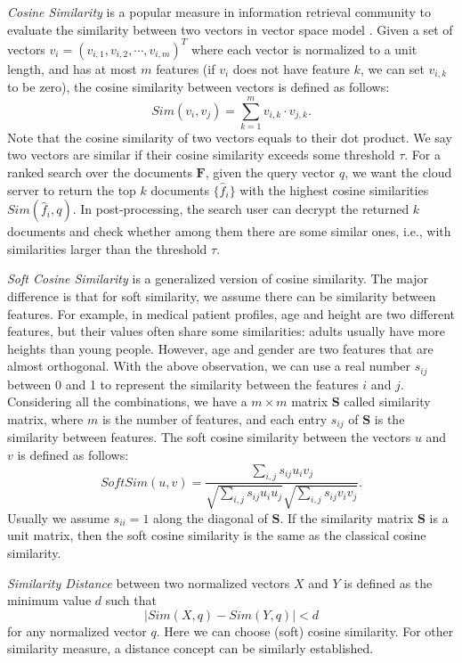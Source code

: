 \documentclass{IEEEtran}
\begin{document}
\emph{Cosine Similarity} \cite{Sun13, ATY13, TAJY14, Xia16} is a popular measure in information retrieval community to evaluate the similarity between two vectors in vector space model \cite{Sun13,ATY13,TAJY14}. Given a set of vectors $v_i = (v_{i,1}, v_{i,2}, \cdots, v_{i,m})^T$ where each vector is normalized to a unit length, and has at most $m$ features (if $v_i$ does not have feature $k$, we can set $v_{i,k}$ to be zero), the cosine similarity between vectors is defined as follows:
$$Sim(v_i,v_j) = \sum_{k=1}^m v_{i,k}\cdot v_{j,k}.$$
Note that the cosine similarity of two vectors equals to their dot product. We say two vectors are similar if their cosine similarity exceeds some threshold $\tau$. For a ranked search over the documents $\mathbf{F}$, given the query vector $q$, we want the cloud server to return the top $k$ documents $\{\hat{f}_i\}$ with the highest cosine similarities $Sim(\hat{f}_i, q)$. In post-processing, the search user can decrypt the returned $k$ documents and check whether among them there are some similar ones, i.e., with similarities larger than the threshold $\tau$.

\emph{Soft Cosine Similarity} \cite{Soft14} is a generalized version of cosine similarity. The major difference is that for soft similarity, we assume there can be similarity between features. For example, in medical patient profiles, age and height are two different features, but their values often share some similarities: adults usually have more heights than young people. However, age and gender are two features that are almost orthogonal. With the above observation, we can use a real number $s_{ij}$ between 0 and 1 to represent the similarity between the features $i$ and $j$. Considering all the combinations, we have a $m \times m$ matrix $\mathbf{S}$ called similarity matrix, where $m$ is the number of features, and each entry $s_{ij}$ of $\mathbf{S}$ is the similarity between features. The soft cosine similarity between the vectors $u$ and $v$ is defined as follows:
\begin{equation}\label{eqn:soft}
SoftSim(u, v) = \frac{\sum_{i,j}s_{ij}u_i v_j}{\sqrt{\sum_{i,j}s_{ij}u_i u_j} \sqrt{\sum_{i,j}s_{ij}v_i v_j}}.\end{equation}
Usually we assume $s_{ii} = 1$ along the diagonal of $\mathbf{S}$. 
If the similarity matrix $\mathbf{S}$ is a unit matrix, then the soft cosine similarity is the same as the classical cosine similarity.

\emph{Similarity Distance} between two normalized vectors $X$ and $Y$ is defined as the minimum value $d$ such that 
$$|Sim(X, q) - Sim(Y, q)|<d$$ 
for any normalized vector $q$. Here we can choose (soft) cosine similarity. For other similarity measure, a distance concept can be similarly established.
\end{document}
